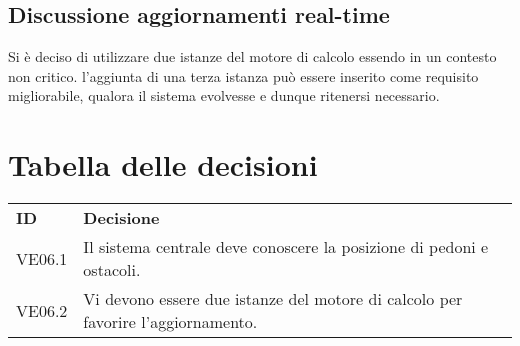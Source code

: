 \documentclass[]{article}
\begin{document}
	\subsection{Discussione aggiornamenti real-time}
 	Si è deciso di utilizzare due istanze del motore di calcolo essendo in un contesto non critico.
 	l'aggiunta di una terza istanza può essere inserito come requisito migliorabile, qualora il sistema evolvesse e dunque ritenersi necessario.
	\newpage

	\section{Tabella delle decisioni}

	\begin{table} [h!]
		\begin{center}
			\begin{tabular} { m{2cm} m{14cm} }
				\rowcolor{lightgray}
				\textbf{ID} & \textbf{Decisione}\\
				VE06.1 & Il sistema centrale deve conoscere la posizione di pedoni e ostacoli.\\
				VE06.2 & Vi devono essere due istanze del motore di calcolo per favorire l'aggiornamento.\\

			\end{tabular}
		\end{center}
	\end{table}
\end{document}
